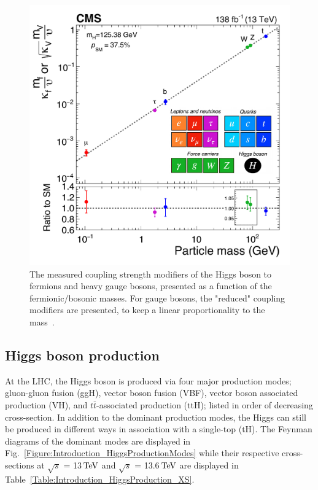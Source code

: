 \begin{figure}[h]
\centering
\includegraphics[width= .7\textwidth]{Figures/Introduction/CMS_Higgs_FermionCouplings.pdf}
\caption{The measured coupling strength modifiers of the Higgs boson to fermions and heavy gauge bosons, presented as a function of the fermionic/bosonic masses. For gauge bosons, the "reduced" coupling modifiers are presented, to keep a linear proportionality to the mass~\cite{CMS_Couplings_Measurement}.}
\label{Figure:Introduction_CMScouplings}
\end{figure}

\subsection{Higgs boson production}

At the \ac{LHC}, the Higgs boson is produced via four major production modes; gluon-gluon fusion (ggH), vector boson fusion (VBF), vector boson associated production (VH), and $t\overline{t}$-associated production (ttH); listed in order of decreasing cross-section. In addition to the dominant production modes, the Higgs can still be produced in different ways \eg in association with a single-top (tH). The Feynman diagrams of the dominant modes are displayed in Fig.~\ref{Figure:Introduction_HiggsProductionModes} while their respective cross-sections at $\sqrt{s}$ = 13$\,\text{Te\hspace{-.08em}V}$ and $\sqrt{s}$ = 13.6$\,\text{Te\hspace{-.08em}V}$ are displayed in Table~\ref{Table:Introduction_HiggsProduction_XS}. 


